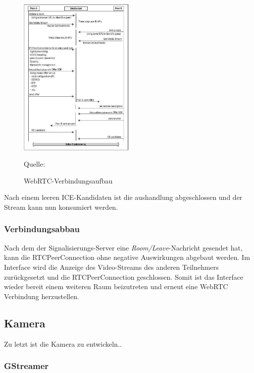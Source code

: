 \documentclass{article}
\newcommand{\figuresource}[1]{
	\begin{center}Quelle: #1\end{center}
}
\begin{document}
\begin{onecolumn}
\begin{figure}[ht]
	\includegraphics[width=0.5\textwidth]{cited-webrtc-connection-establishment}
	\centering
	\caption[WebRTC-Verbindungsaufbau~\cite{WebRTC}]{WebRTC-Verbindungsaufbau}
	\figuresource{\cite{WebRTC}}
\end{figure}

Nach einem leeren ICE-Kandidaten ist die aushandlung abgeschlossen und der
Stream kann nun konsumiert werden.

\subsubsection{Verbindungsabbau}

Nach dem der Signalisierungs-Server eine \textit{Room/Leave}-Nachricht gesendet
hat, kann die RTCPeerConnection ohne negative Auswirkungen abgebaut werden. Im
Interface wird die Anzeige des Video-Streams des anderen Teilnehmers
zurückgesetzt und die RTCPeerConnection geschlossen. Somit ist das Interface
wieder bereit einem weiteren Raum beizutreten und erneut eine WebRTC Verbindung
herzustellen.


\subsection{Kamera}

Zu letzt ist die Kamera zu entwickeln..

\subsubsection{GStreamer}


\end{onecolumn}
\end{document}
